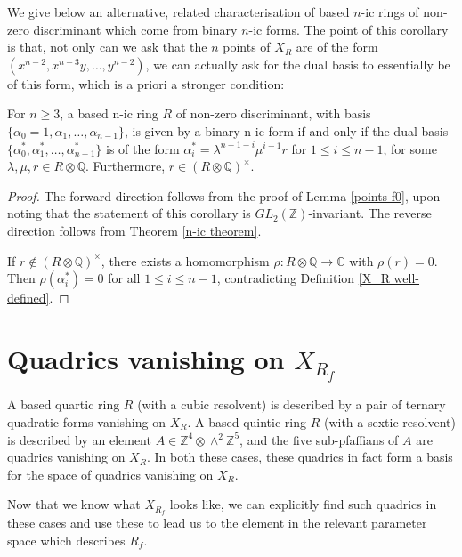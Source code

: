 \documentclass{report}
\begin{document}
We give below an alternative, related characterisation of based $n$-ic rings of non-zero discriminant which come from binary $n$-ic forms.  The point of this corollary is that, not only can we ask that the $n$ points of $X_R$ are of the form $(x^{n-2},x^{n-3} y, \ldots, y^{n-2})$, we can actually ask for the dual basis to essentially be of this form, which is a priori a stronger condition:

\begin{corollary}
For $n \geq 3$, a based n-ic ring $R$ of non-zero discriminant, with basis $\{\alpha_0 = 1, \alpha_1, \ldots, \alpha_{n-1} \}$, is given by a binary n-ic form if and only if the dual basis $\{ \alpha_0^*, \alpha_1^*, \ldots, \alpha_{n-1}^* \}$ is of the form $\alpha_i^* = \lambda^{n-1-i} \mu^{i-1} r$ for $1 \leq i \leq n-1$, for some $\lambda, \mu, r \in R \otimes \mathbb{Q}$.  Furthermore, $r \in (R \otimes \mathbb{Q})^\times$.
\end{corollary}

\begin{proof}
The forward direction follows from the proof of Lemma \ref{points f0}, upon noting that the statement of this corollary is $GL_2(\mathbb{Z})$-invariant.  The reverse direction follows from Theorem \ref{n-ic theorem}.

If $r \notin (R \otimes \mathbb{Q})^\times$, there exists a homomorphism $\rho : R \otimes \mathbb{Q} \to \mathbb{C}$ with $\rho(r) = 0$.  Then $\rho(\alpha_i^*) = 0$ for all $1 \leq i \leq n-1$, contradicting Definition \ref{X_R well-defined}.
\end{proof}

\section{Quadrics vanishing on $X_{R_f}$}

A based quartic ring $R$ (with a cubic resolvent) is described by a pair of ternary quadratic forms vanishing on $X_R$.  A based quintic ring $R$ (with a sextic resolvent) is described by an element $A \in \mathbb{Z}^4 \otimes \wedge^2 \mathbb{Z}^5$, and the five sub-pfaffians of $A$ are quadrics vanishing on $X_R$.  In both these cases, these quadrics in fact form a basis for the space of quadrics vanishing on $X_R$.

Now that we know what $X_{R_f}$ looks like, we can explicitly find such quadrics in these cases and use these to lead us to the element in the relevant parameter space which describes $R_f$.
\end{document}

